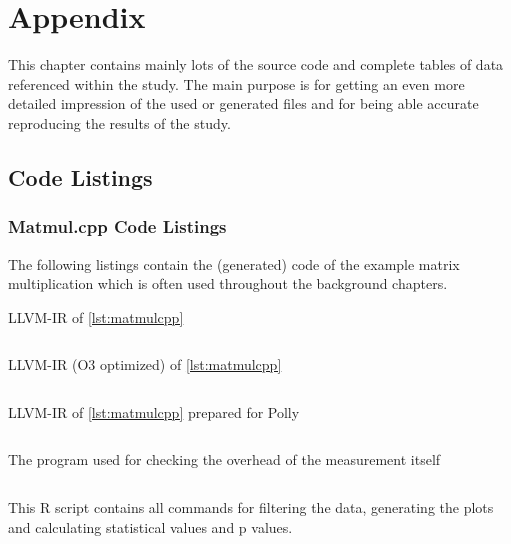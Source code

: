 \chapter{Appendix}
This chapter contains mainly lots of the source code and complete tables of data referenced within the study.
The main purpose is for getting an even more detailed impression of the used or generated files and for being able accurate reproducing the results of the study.

\section{Code Listings}
\subsection{Matmul.cpp Code Listings}
The following listings contain the (generated) code of the example matrix multiplication which is often used throughout the background chapters.
\begin{code}
    \caption{LLVM-IR of \autoref{lst:matmulcpp}}
    \inputminted[fontsize=\tiny]{LLVM}{ll/matmul.ll}
    \label{lst:matmulll}
\end{code}
\begin{code}
    \caption{LLVM-IR (O3 optimized) of \autoref{lst:matmulcpp}}
    \inputminted[fontsize=\tiny]{LLVM}{ll/matmulO3.ll}
    \label{lst:matmulllO3}
\end{code}
\begin{code}
    \caption{LLVM-IR of \autoref{lst:matmulcpp} prepared for Polly}
    \inputminted[fontsize=\tiny]{LLVM}{ll/matmul.preopt.ll}
    \label{lst:matmulpreoptll}
\end{code}
\begin{code}
    \caption[Program for checking overhead]{The program used for checking the overhead of the measurement itself}
    \inputminted{c++}{cpp/checkMeasurementOverhead.cpp}
    \label{lst:checkOverhead}
\end{code}
\begin{code}
    \caption[Script for plots and statistic]{This R script contains all commands for filtering the data, generating the plots and calculating statistical values and p values.}
    \inputminted[fontsize=\tiny]{R}{r/generatePlotsAndTables.R}
    \label{lst:rscript}
\end{code}

